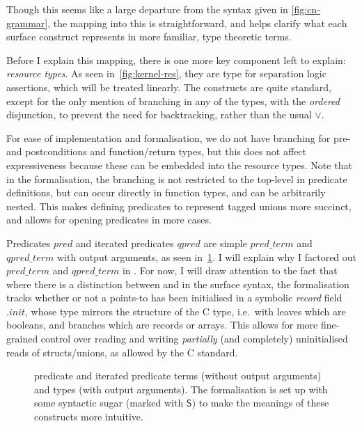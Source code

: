 Though this seems like a large departure from the syntax given in
\cref{fig:cn-grammar}, the mapping into this is straightforward, and helps
clarify what each  surface construct represents in more familiar,
type theoretic terms.

Before I explain this mapping, there is one more key component left to explain:
\emph{resource types}. As seen in~\cref{fig:kernel-res}, they are type for
separation logic assertions, which will be treated linearly. The constructs are
quite standard, except for the only mention of branching in any of the types,
with the \emph{ordered} disjunction, to prevent the need for backtracking,
rather than the usual $\vee{}$.

For ease of implementation and formalisation, we do not have branching for pre-
and postconditions and function/return types, but this does not affect
expressiveness because these can be embedded into the resource types. Note that
in the formalisation, the branching is not restricted to the top-level in
predicate definitions, but can occur directly in function types, and can be
arbitrarily nested. This makes defining predicates to represent tagged unions
more succinct, and allows for opening predicates in more cases.

Predicates ${pred}$ and iterated predicates ${qpred}$ are simple ${pred\_term}$
and ${qpred\_term}$ with output arguments, as seen in~\cref{fig:kernel-qpred}.
I will explain why I factored out ${pred\_term}$ and ${qpred\_term}$ in
. For now, I will draw attention to the fact that
where there is a distinction between  and  in
the surface syntax, the formalisation tracks whether or not a points-to has
been initialised in a symbolic \emph{record} field ${.init}$, whose type
mirrors the structure of the C type, i.e.\ with leaves which are booleans, and
branches which are records or arrays. This allows for more fine-grained control
over reading and writing \emph{partially} (and completely) uninitialised reads
of structs/unions,\label{sn:partial-init-read}
as allowed by the C standard.

\begin{figure}
    \small
    \raggedright{}
    \grammartabularSTY{%
        \cnpredXXname{}\cninterrule{}
        \cnpredXXterm{}\cninterrule{}
        \cnqpredXXterm{}\cnafterlastrule{}
    }
    \begingroup%
    \renewcommand{\cnprodline}{\cnprodlineCommentNewline}
    \grammartabularSTY{%
        \cnqpred{}\cnafterlastrule{}
    }
    \endgroup%
    \caption{ predicate and iterated predicate terms (without
        output arguments) and types (with output arguments). The formalisation
        is set up with some syntactic sugar (marked with $\mathsf{S}$) to make
        the meanings of these constructs more intuitive.}\label{fig:kernel-qpred}

\end{figure}

